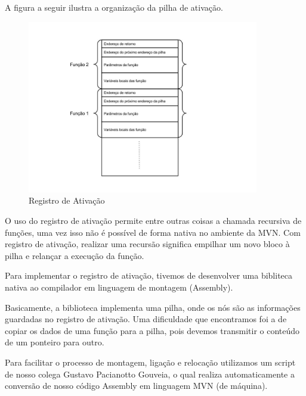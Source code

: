 A figura a seguir ilustra a organização da pilha de ativação.

\begin{figure}[H]
	\centering 
	\includegraphics[width=0.9\textwidth]{img/registro_ativacao.png}  
	\caption{Registro de Ativação}
	\label{fig:registro_ativacao}
\end{figure}

O uso do registro de ativação permite entre outras coisas a chamada recursiva de funções, uma vez isso não é possível de forma nativa no ambiente da MVN. Com registro de ativação, realizar uma recursão significa empilhar um novo bloco à pilha e relançar a execução da função.


Para implementar o registro de ativação, tivemos de desenvolver uma bibliteca nativa ao compilador em linguagem de montagem (Assembly).


Basicamente, a biblioteca implementa uma pilha, onde os nós são as informações guardadas no registro de ativação.
Uma dificuldade que encontramos foi a de copiar os dados de uma função para a pilha, pois devemos transmitir o conteúdo de um ponteiro para outro. 


Para facilitar o processo de montagem, ligação e relocação utilizamos um script de nosso colega Gustavo Pacianotto Gouveia, o qual realiza automaticamente a conversão de nosso código Assembly em linguagem MVN (de máquina).